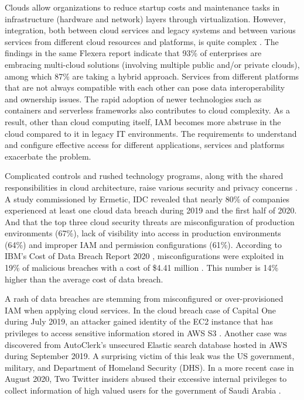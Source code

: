 \documentclass[a4paper,twoside]{article}
\begin{document}
Clouds allow organizations to reduce startup costs and maintenance tasks in infrastructure (hardware and network) layers through virtualization. However, integration, both between cloud services and legacy systems and between various services from different cloud resources and platforms, is quite complex \cite{Baron2019}. 
The findings in the same Flexera report \cite{Flexera2020} indicate that 93\% of enterprises are embracing multi-cloud solutions (involving multiple public and/or private clouds), among which 87\% are taking a hybrid approach. Services from different platforms that are not always compatible with each other can pose data interoperability and ownership issues. The rapid adoption of newer technologies such as containers and serverless frameworks also contributes to cloud complexity\cite{Sharrm}. As a result, other than cloud computing itself, IAM becomes more abstruse in the cloud compared to it in legacy IT environments. The requirements to understand and configure effective access for different applications, services and platforms exacerbate the problem. 

Complicated controls and rushed technology programs, along with the shared responsibilities in cloud architecture, raise various security and privacy concerns \cite{Takabi2010}. A study \cite{Ermetic2020} commissioned by Ermetic, IDC revealed that nearly 80\% of companies experienced at least one cloud data breach during 2019 and the first half of 2020. And that the top three cloud security threats are misconfiguration of production environments (67\%), lack of visibility into access in production environments (64\%) and improper IAM and permission configurations (61\%). According to IBM's Cost of Data Breach Report 2020 \cite{IBMSecurity2020}, misconfigurations were exploited in 19\% of malicious breaches with a cost of \$4.41 million . This number is 14\% higher than the average cost of data breach.

A rash of data breaches are stemming from misconfigured or over-provisioned IAM when applying cloud services.
In the cloud breach case of Capital One during July 2019, an attacker gained identity of the EC2 instance that has privileges to access sensitive information stored in AWS S3 \cite{Parimi2019}. 
Another case was discovered from AutoClerk's unsecured Elastic search database hosted in AWS during September 2019. A surprising victim of this leak was the US government, military, and Department of Homeland Security (DHS). \cite{Fawkes2020}
In a more recent case in August 2020, Two Twitter insiders abused their excessive internal privileges to collect information of high valued users for the government of Saudi Arabia \cite{Newman2019}.
\end{document}
